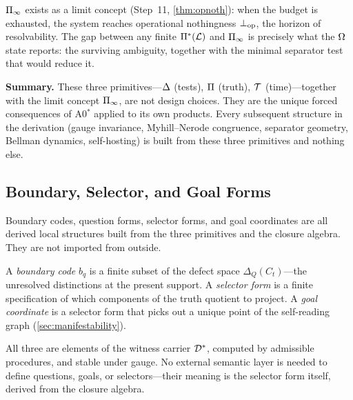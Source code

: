 $\Pi_\infty$ exists as a limit concept (Step~11, \cref{thm:opnoth}): when
the budget is exhausted, the system reaches operational nothingness $\bot_{\mathrm{op}}$,
the horizon of resolvability.  The gap between any finite $\Pi^*(\mathcal{L})$ and
$\Pi_\infty$ is precisely what the $\Omega$ state reports: the surviving
ambiguity, together with the minimal separator test that would reduce it.

\bigskip
\noindent
\textbf{Summary.}  These three primitives---$\Delta$ (tests), $\Pi$ (truth),
$\mathcal{T}$ (time)---together with the limit concept $\Pi_\infty$, are not design
choices.  They are the unique forced consequences of A0$^*$ applied to its own
products.  Every subsequent structure in the derivation (gauge invariance,
Myhill--Nerode congruence, separator geometry, Bellman dynamics,
self-hosting) is built from these three primitives and nothing else.

\subsection{Boundary, Selector, and Goal Forms}
\label{sec:primitives:selectors}

Boundary codes, question forms, selector forms, and goal coordinates are
all derived local structures built from the three primitives and the
closure algebra.  They are not imported from outside.

A \emph{boundary code} $b_q$ is a finite subset of the defect space
$\Delta_Q(C_t)$---the unresolved distinctions at the present support.
A \emph{selector form} is a finite specification of which components of
the truth quotient to project.  A \emph{goal coordinate} is a selector
form that picks out a unique point of the self-reading graph
(\cref{sec:manifestability}).

All three are elements of the witness carrier $\mathcal{D}^*$, computed by
admissible procedures, and stable under gauge.  No external semantic
layer is needed to define questions, goals, or selectors---their meaning
is the selector form itself, derived from the closure algebra.
